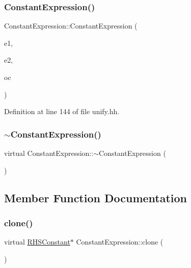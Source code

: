 \subsubsection{\texorpdfstring{ConstantExpression()}{ConstantExpression()}}
{\footnotesize\ttfamily Constant\+Expression\+::\+Constant\+Expression (\begin{DoxyParamCaption}\item[{\mbox{\hyperlink{class_r_h_s_constant}{R\+H\+S\+Constant}} $\ast$}]{e1,  }\item[{\mbox{\hyperlink{class_r_h_s_constant}{R\+H\+S\+Constant}} $\ast$}]{e2,  }\item[{\mbox{\hyperlink{opcodes_8hh_abeb7dfb0e9e2b3114e240a405d046ea7}{Op\+Code}}}]{oc }\end{DoxyParamCaption})\hspace{0.3cm}{\ttfamily [inline]}}



Definition at line 144 of file unify.\+hh.

\mbox{\label{class_constant_expression_a42359d079393068191c175f95f3d1828}} 
\subsubsection{\texorpdfstring{$\sim$ConstantExpression()}{~ConstantExpression()}}
{\footnotesize\ttfamily virtual Constant\+Expression\+::$\sim$\+Constant\+Expression (\begin{DoxyParamCaption}\item[{void}]{ }\end{DoxyParamCaption})\hspace{0.3cm}{\ttfamily [virtual]}}



\subsection{Member Function Documentation}
\mbox{\label{class_constant_expression_aca0a8cd24e458d11ccfd766a1559215c}} 
\subsubsection{\texorpdfstring{clone()}{clone()}}
{\footnotesize\ttfamily virtual \mbox{\hyperlink{class_r_h_s_constant}{R\+H\+S\+Constant}}$\ast$ Constant\+Expression\+::clone (\begin{DoxyParamCaption}\item[{void}]{ }\end{DoxyParamCaption})\hspace{0.3cm}{\ttfamily [virtual]}}



